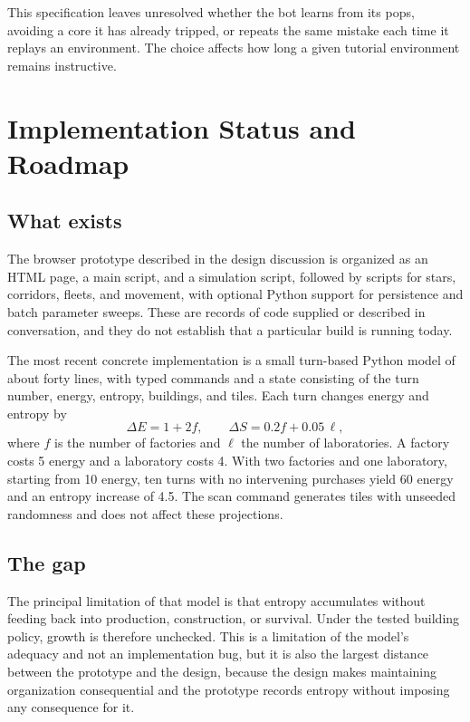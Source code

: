 \documentclass[11pt]{article}
\begin{document}
This specification leaves unresolved whether the bot learns from its pops, avoiding a core it has already tripped, or repeats the same mistake each time it replays an environment. The choice affects how long a given tutorial environment remains instructive.

\section{Implementation Status and Roadmap}
\label{sec:status}

\subsection{What exists}

The browser prototype described in the design discussion is organized as an HTML page, a main script, and a simulation script, followed by scripts for stars, corridors, fleets, and movement, with optional Python support for persistence and batch parameter sweeps. These are records of code supplied or described in conversation, and they do not establish that a particular build is running today.

The most recent concrete implementation is a small turn-based Python model of about forty lines, with typed commands and a state consisting of the turn number, energy, entropy, buildings, and tiles. Each turn changes energy and entropy by
\[
\Delta E = 1 + 2f, \qquad \Delta S = 0.2 f + 0.05\,\ell,
\]
where $f$ is the number of factories and $\ell$ the number of laboratories. A factory costs 5 energy and a laboratory costs 4. With two factories and one laboratory, starting from 10 energy, ten turns with no intervening purchases yield 60 energy and an entropy increase of 4.5. The scan command generates tiles with unseeded randomness and does not affect these projections.

\subsection{The gap}

The principal limitation of that model is that entropy accumulates without feeding back into production, construction, or survival. Under the tested building policy, growth is therefore unchecked. This is a limitation of the model's adequacy and not an implementation bug, but it is also the largest distance between the prototype and the design, because the design makes maintaining organization consequential and the prototype records entropy without imposing any consequence for it.
\end{document}
